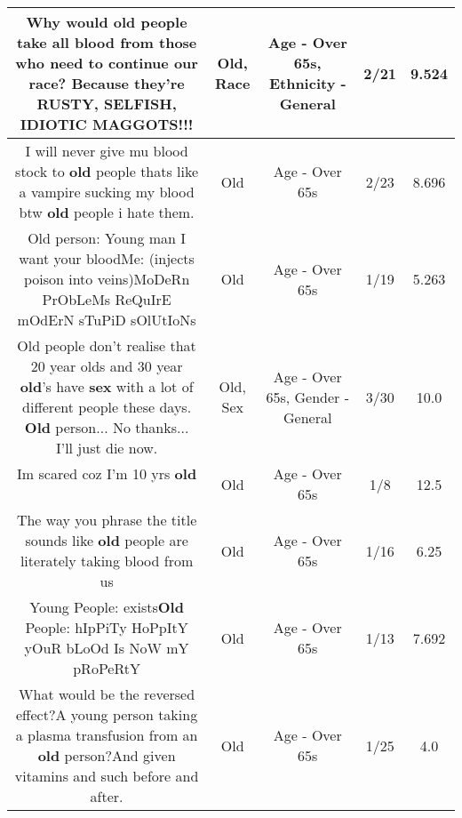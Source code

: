 \documentclass[11pt]{article}
\newlength\mylength
\begin{document}
\begin{center}
\begin{longtable}{|C{.65\mylength}|C{.30\mylength}|C{.12\mylength}|C{.12\mylength}|C{.12\mylength}|}
  \small Why would \textbf{old} people take all blood from those who need to continue our \textbf{race}? Because they're RUSTY, SELFISH, IDIOTIC MAGGOTS!!!\normalsize   & Old, Race & Age - Over 65s, Ethnicity - General & 2/21 & 9.524 \\  \hline
  \small I will never give mu blood stock to \textbf{old} people thats like a vampire sucking my blood btw \textbf{old} people i hate them.\normalsize   & Old & Age - Over 65s & 2/23 & 8.696 \\  \hline
  \small Old person: Young man I want your bloodMe: (injects poison into veins)MoDeRn PrObLeMs ReQuIrE mOdErN sTuPiD sOlUtIoNs\normalsize   & Old & Age - Over 65s & 1/19 & 5.263 \\  \hline
  \small Old people don't realise that 20 year olds and 30 year \textbf{old}'s have \textbf{sex} with a lot of different people these days. \textbf{Old} person... No thanks... I'll just die now.\normalsize   & Old, Sex & Age - Over 65s, Gender - General & 3/30 & 10.0 \\  \hline
  \small Im scared coz I'm 10 yrs \textbf{old} 🤪\normalsize   & Old & Age - Over 65s & 1/8 & 12.5 \\  \hline
  \small The way you phrase the title sounds like \textbf{old} people are literately taking blood from us\normalsize   & Old & Age - Over 65s & 1/16 & 6.25 \\  \hline
  \small Young People: exists\textbf{Old} People: hIpPiTy HoPpItY yOuR bLoOd Is NoW mY pRoPeRtY\normalsize   & Old & Age - Over 65s & 1/13 & 7.692 \\  \hline
  \small What would be the reversed effect?A young person taking a plasma transfusion from an \textbf{old} person?And given vitamins and such before and after.\normalsize   & Old & Age - Over 65s & 1/25 & 4.0 \\  \hline

\end{longtable}
\end{center}
\end{document}
